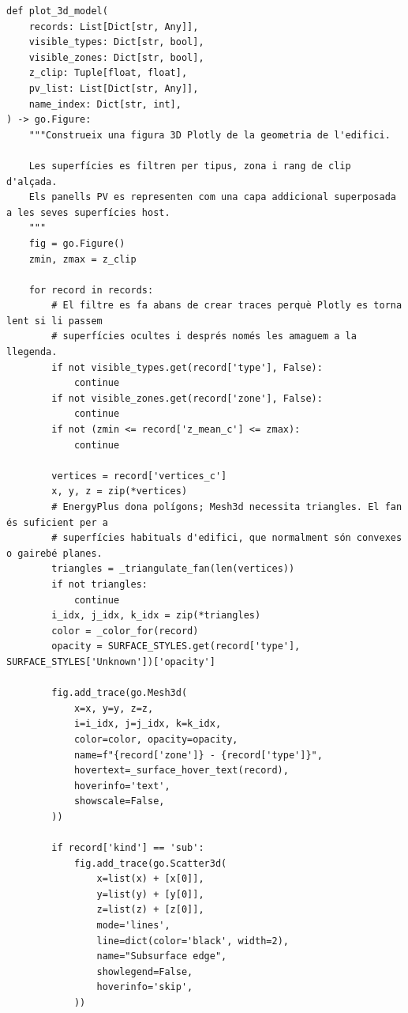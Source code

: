 \documentclass[10pt,a4paper]{article}
\begin{document}
\begin{lstlisting}[style=studioPython,caption={backend/viewer\_3d\_backend.py},label={lst:backend-viewer-3d-backend-py}]
def plot_3d_model(
    records: List[Dict[str, Any]],
    visible_types: Dict[str, bool],
    visible_zones: Dict[str, bool],
    z_clip: Tuple[float, float],
    pv_list: List[Dict[str, Any]],
    name_index: Dict[str, int],
) -> go.Figure:
    """Construeix una figura 3D Plotly de la geometria de l'edifici.

    Les superfícies es filtren per tipus, zona i rang de clip d'alçada.
    Els panells PV es representen com una capa addicional superposada a les seves superfícies host.
    """
    fig = go.Figure()
    zmin, zmax = z_clip

    for record in records:
        # El filtre es fa abans de crear traces perquè Plotly es torna lent si li passem
        # superfícies ocultes i després només les amaguem a la llegenda.
        if not visible_types.get(record['type'], False):
            continue
        if not visible_zones.get(record['zone'], False):
            continue
        if not (zmin <= record['z_mean_c'] <= zmax):
            continue

        vertices = record['vertices_c']
        x, y, z = zip(*vertices)
        # EnergyPlus dona polígons; Mesh3d necessita triangles. El fan és suficient per a
        # superfícies habituals d'edifici, que normalment són convexes o gairebé planes.
        triangles = _triangulate_fan(len(vertices))
        if not triangles:
            continue
        i_idx, j_idx, k_idx = zip(*triangles)
        color = _color_for(record)
        opacity = SURFACE_STYLES.get(record['type'], SURFACE_STYLES['Unknown'])['opacity']

        fig.add_trace(go.Mesh3d(
            x=x, y=y, z=z,
            i=i_idx, j=j_idx, k=k_idx,
            color=color, opacity=opacity,
            name=f"{record['zone']} - {record['type']}",
            hovertext=_surface_hover_text(record),
            hoverinfo='text',
            showscale=False,
        ))

        if record['kind'] == 'sub':
            fig.add_trace(go.Scatter3d(
                x=list(x) + [x[0]],
                y=list(y) + [y[0]],
                z=list(z) + [z[0]],
                mode='lines',
                line=dict(color='black', width=2),
                name="Subsurface edge",
                showlegend=False,
                hoverinfo='skip',
            ))


\end{lstlisting}
\end{document}

